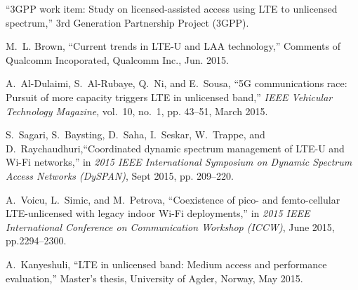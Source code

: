 %
%

\begin{thebibliography}{99.}%
``{3GPP} work item: Study on licensed-assisted access using {LTE} to unlicensed spectrum,'' 3rd Generation Partnership Project (3GPP).

M.~L. Brown, ``Current trends in {LTE-U} and {LAA} technology,'' Comments of Qualcomm Incoporated, Qualcomm Inc., Jun. 2015.

A.~Al-Dulaimi, S.~Al-Rubaye, Q.~Ni, and E.~Sousa, ``{5G} communications race: Pursuit of more capacity triggers {LTE} in unlicensed band,'' \emph{IEEE Vehicular Technology Magazine}, vol.~10, no.~1, pp. 43--51, March 2015.

 S.~Sagari, S.~Baysting, D.~Saha, I.~Seskar, W.~Trappe, and D.~Raychaudhuri,``Coordinated dynamic spectrum management of {LTE-U} and {Wi-Fi} networks,''
in \emph{2015 IEEE International Symposium on Dynamic Spectrum Access Networks (DySPAN)}, Sept 2015, pp. 209--220.

A.~Voicu, L.~Simic, and M.~Petrova, ``Coexistence of pico- and femto-cellular {LTE}-unlicensed with legacy indoor {Wi-Fi} deployments,'' in \emph{2015 IEEE	International Conference on Communication Workshop (ICCW)}, June 2015, pp.2294--2300.

A.~Kanyeshuli, ``{LTE} in unlicensed band: Medium access and performance evaluation,'' Master's thesis, University of Agder, Norway, May 2015.
\end{thebibliography}
